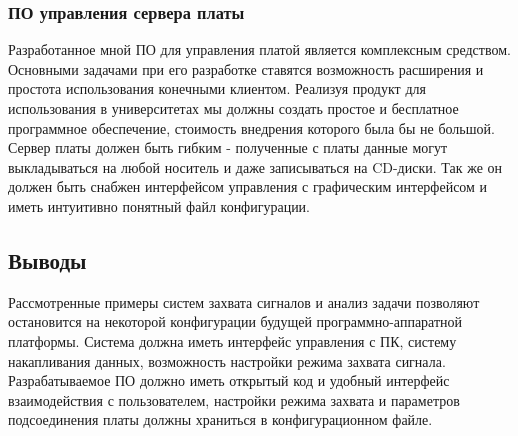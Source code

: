 \subsubsection*{ПО управления сервера платы}
\label{razdel1_sw}
Разработанное мной ПО для управления платой является комплексным средством. Основными задачами при его разработке ставятся возможность
расширения и простота использования конечными клиентом. Реализуя продукт для использования в университетах мы должны создать
простое и бесплатное программное обеспечение, стоимость внедрения которого была бы не большой.
Сервер платы должен быть гибким - полученные с платы данные могут выкладываться на любой носитель и даже записываться на CD-диски.
Так же он должен быть снабжен интерфейсом управления с графическим интерфейсом и иметь интуитивно понятный файл конфигурации.

\subsection*{Выводы}
Рассмотренные примеры систем захвата сигналов и анализ задачи позволяют остановится на некоторой конфигурации будущей программно-аппаратной
платформы. Система должна иметь интерфейс управления с ПК, систему накапливания данных, возможность настройки режима захвата сигнала.
Разрабатываемое ПО должно иметь открытый код и удобный интерфейс взаимодействия с пользователем, настройки режима захвата и 
параметров подсоединения платы должны храниться в конфигурационном файле.

\newpage
